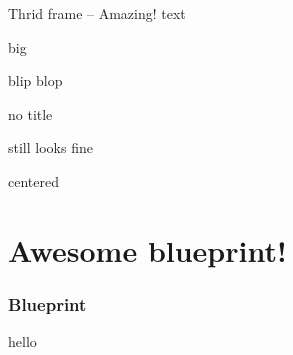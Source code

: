 \documentclass[aspectratio=169]{beamer}
\begin{document}
\begin{frame}{Thrid frame -- Amazing!}
  text

  \begin{tcolorbox}[frame hidden,fuzzy shadow={1mm}{-1mm}{0mm}{.3mm}{black},enhanced,colback=mycolor]
    big
  \end{tcolorbox}


  \begin{center}
  \end{center}

  \begin{block}{blip}
    blop
  \end{block}

  \begin{block}{}
    no title

    still looks fine
  \end{block}

  \begin{center}
    \begin{block}{}
      centered
    \end{block}
  \end{center}
\end{frame}


\section{Awesome blueprint!}
\begin{blueprintframe}
  \frametitle{Blueprint}
  hello
\end{blueprintframe}
\end{document}
